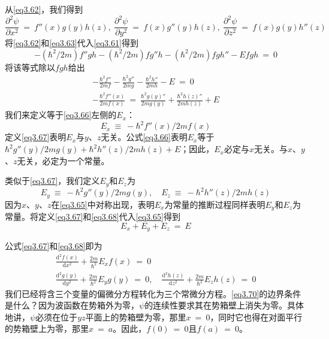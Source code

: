 \documentclass[12pt,a4paper,openany]{ctexbook}
\begin{document}
\begin{flushleft}
从\eqref{eq3.62}，我们得到
\begin{equation}
    \frac{\partial^2\psi}{\partial x^2}\ =\ f''(x)g(y)h(z),\ \frac{\partial^2\psi}{\partial y^2}\ =\ f(x)g''(y)h(z),\ \frac{\partial^2\psi}{\partial z^2}\ =\ f(x)g(y)h''(z) \label{eq3.63}
\end{equation}
将\eqref{eq3.62}和\eqref{eq3.63}代入\eqref{eq3.61}得到
\begin{equation}
    -(\hbar^2/2m)f''gh-(\hbar^2/2m)fg''h-(\hbar^2/2m)fgh''-Efgh\ =\ 0
\end{equation}
将该等式除以$fgh$给出
\begin{gather}
    -\frac{\hbar^2f''}{2mf}-\frac{\hbar^2g''}{2mg}-\frac{\hbar^2h''}{2mh}-E\ =\ 0 \label{eq3.65} \\
    -\frac{\hbar^2f''(x)}{2mf(x)}\ =\ \frac{\hbar^2g(y)''}{2mg(y)}+\frac{\hbar^2h(z)''}{2mh(z)}+E \label{eq3.66}
\end{gather}
我们来定义等于\eqref{eq3.66}左侧的$E_x$：
\begin{equation}
    E_x\ \equiv\ -\hbar^2f''(x)/2mf(x) \label{eq3.67}
\end{equation}
定义\eqref{eq3.67}表明$E_x$与$y$、$z$无关。公式\eqref{eq3.66}表明$E_x$等于$\hbar^2 g''(y)/2mg(y)+\hbar^2 h''(z)/2mh(z)+E$；因此，$E_x$必定与$x$无关。与$x$、$y$、$z$无关，必定为一个常量。

类似于\eqref{eq3.67}，我们定义$E_y$和$E_z$为
\begin{equation}
    E_y\ \equiv\ -\hbar^2g''(y)/2mg(y),\quad E_z\ \equiv\ -\hbar^2h''(z)/2mh(z) \label{eq3.68}
\end{equation}
因为$x$、$y$、$z$在\eqref{eq3.65}中对称出现，表明$E_x$为常量的推断过程同样表明$E_y$和$E_z$为常量。将定义\eqref{eq3.67}和\eqref{eq3.68}代入\eqref{eq3.65}得到
\begin{equation}
    E_x+E_y+E_z\ =\ E \label{eq3.69}
\end{equation}

公式\eqref{eq3.67}和\eqref{eq3.68}即为
\begin{gather}
    \frac{\mathrm{d}^2f(x)}{\mathrm{d}x^2}+\frac{2m}{\hbar^2}E_xf(x)\ =\ 0 \label{eq3.70} \\
    \frac{\mathrm{d}^2g(y)}{\mathrm{d}y^2}+\frac{2m}{\hbar^2}E_yg(y)\ =\ 0,\quad\frac{\mathrm{d}^2h(z)}{\mathrm{d}z^2}+\frac{2m}{\hbar^2}E_zh(z)\ =\ 0 \label{eq3.71}
\end{gather}
我们已经将含三个变量的偏微分方程转化为三个常微分方程。\eqref{eq3.70}的边界条件是什么？因为波函数在势箱外为零，$\psi$的连续性要求其在势箱壁上消失为零。具体地讲，$\psi$必须在位于$yz$平面上的势箱壁为零，那里$x\ =\ 0$，同时它也得在对面平行的势箱壁上为零，那里$x\ =\ a$。因此，$f(0)\ =\ 0$且$f(a)\ =\ 0$。


\end{flushleft}
\end{document}
